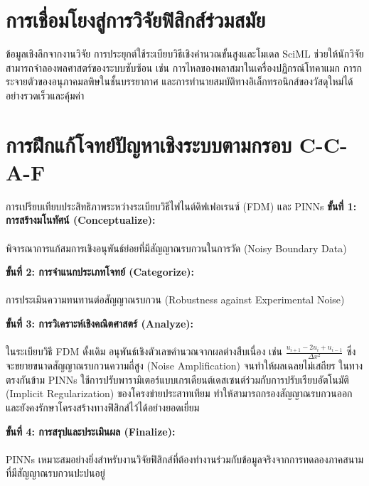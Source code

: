 \section{การเชื่อมโยงสู่การวิจัยฟิสิกส์ร่วมสมัย}

\begin{researchbox}{ข้อมูลเชิงลึกจากงานวิจัย}
การประยุกต์ใช้ระเบียบวิธีเชิงคำนวณขั้นสูงและโมเดล SciML ช่วยให้นักวิจัยสามารถจำลองพลศาสตร์ของระบบซับซ้อน เช่น การไหลของพลาสมาในเครื่องปฏิกรณ์โทคาแมก การกระจายตัวของอนุภาคมลพิษในชั้นบรรยากาศ และการทำนายสมบัติทางอิเล็กทรอนิกส์ของวัสดุใหม่ได้อย่างรวดเร็วและคุ้มค่า
\end{researchbox}

\section{การฝึกแก้โจทย์ปัญหาเชิงระบบตามกรอบ C-C-A-F}

\begin{ccafsolution}{การเปรียบเทียบประสิทธิภาพระหว่างระเบียบวิธีไฟไนต์ดิฟเฟอเรนซ์ (FDM) และ PINNs}
\textbf{ขั้นที่ 1: การสร้างมโนทัศน์ (Conceptualize):}\\\\ พิจารณาการแก้สมการเชิงอนุพันธ์ย่อยที่มีสัญญาณรบกวนในการวัด (Noisy Boundary Data)

\vspace{4pt}
\textbf{ขั้นที่ 2: การจำแนกประเภทโจทย์ (Categorize):}\\\\ การประเมินความทนทานต่อสัญญาณรบกวน (Robustness against Experimental Noise)

\vspace{4pt}
\textbf{ขั้นที่ 3: การวิเคราะห์เชิงคณิตศาสตร์ (Analyze):}\\\\ ในระเบียบวิธี FDM ดั้งเดิม อนุพันธ์เชิงตัวเลขคำนวณจากผลต่างสืบเนื่อง เช่น $\frac{u_{i+1} - 2u_i + u_{i-1}}{\Delta x^2}$ ซึ่งจะขยายขนาดสัญญาณรบกวนความถี่สูง (Noise Amplification) จนทำให้ผลเฉลยไม่เสถียร
ในทางตรงกันข้าม PINNs ใช้การปรับพารามิเตอร์แบบเกรเดียนต์เดสเซนต์ร่วมกับการปรับเรียบอัตโนมัติ (Implicit Regularization) ของโครงข่ายประสาทเทียม ทำให้สามารถกรองสัญญาณรบกวนออกและยังคงรักษาโครงสร้างทางฟิสิกส์ไว้ได้อย่างยอดเยี่ยม

\vspace{4pt}
\textbf{ขั้นที่ 4: การสรุปและประเมินผล (Finalize):}\\\\ PINNs เหมาะสมอย่างยิ่งสำหรับงานวิจัยฟิสิกส์ที่ต้องทำงานร่วมกับข้อมูลจริงจากการทดลองภาคสนามที่มีสัญญาณรบกวนปะปนอยู่
\end{ccafsolution}

